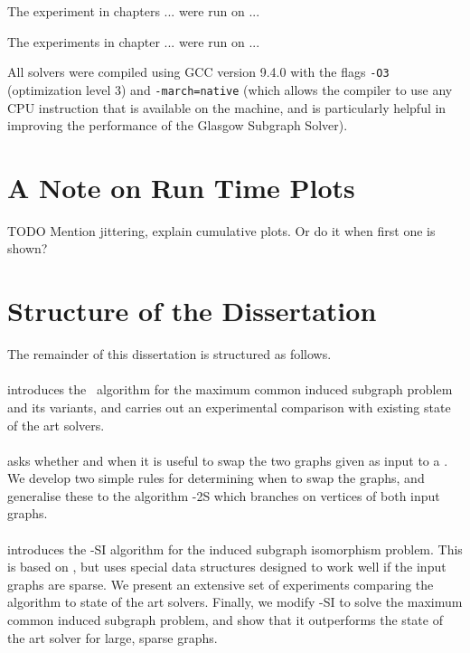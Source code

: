 The experiment in chapters ... were run on ...

The experiments in chapter ... were run on ...

All solvers were compiled using GCC version 9.4.0 with the flags
\texttt{-O3} (optimization level 3) and \texttt{-march=native}
(which allows the compiler to use any CPU instruction that is available
on the machine, and is particularly helpful in improving the performance
of the Glasgow Subgraph Solver).

\section{A Note on Run Time Plots}

TODO Mention jittering, explain cumulative plots. Or do it when first
one is shown?

\section{Structure of the Dissertation}

The remainder of this dissertation is structured as follows.

\paragraph*{} introduces the \McSplit\ algorithm
for the maximum common induced subgraph problem and its variants, and carries out
an experimental comparison with existing state of the art solvers.

\paragraph*{} asks whether and when
it is useful to swap the two graphs given as input to a \McSplit.  We develop
two simple rules for determining when to swap the graphs, and generalise
these to the algorithm \McSplit-2S which branches on vertices of both
input graphs.

\paragraph*{} introduces the \McSplit-SI algorithm for the
induced subgraph isomorphism problem.  This is based on \McSplit, but uses
special data structures designed to work well if the input graphs are sparse.
We present an extensive set of experiments comparing the algorithm to state of
the art solvers.  Finally, we modify \McSplit-SI to solve the maximum common
induced subgraph problem, and show that it outperforms the state of the art
solver for large, sparse graphs.


